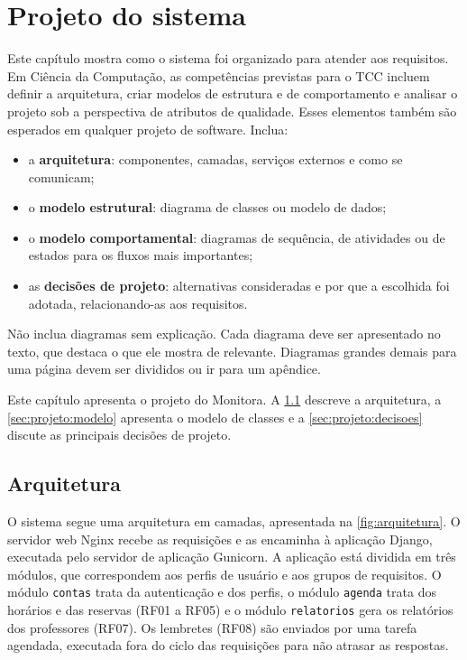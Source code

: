 \chapter{Projeto do sistema}
\label{cap:projeto}

\begin{instrucao}
Este capítulo mostra como o sistema foi organizado para atender aos
requisitos. Em Ciência da Computação, as competências previstas para o TCC
incluem definir a arquitetura, criar modelos de estrutura e de comportamento e
analisar o projeto sob a perspectiva de atributos de qualidade. Esses
elementos também são esperados em qualquer projeto de software. Inclua:
\begin{itemize}
  \item a \textbf{arquitetura}: componentes, camadas, serviços externos e como
        se comunicam;
  \item o \textbf{modelo estrutural}: diagrama de classes ou modelo de dados;
  \item o \textbf{modelo comportamental}: diagramas de sequência, de atividades
        ou de estados para os fluxos mais importantes;
  \item as \textbf{decisões de projeto}: alternativas consideradas e por que a
        escolhida foi adotada, relacionando-as aos requisitos.
\end{itemize}
Não inclua diagramas sem explicação. Cada diagrama deve ser apresentado no
texto, que destaca o que ele mostra de relevante. Diagramas grandes demais
para uma página devem ser divididos ou ir para um apêndice.
\end{instrucao}

Este capítulo apresenta o projeto do Monitora. A
\cref{sec:projeto:arquitetura} descreve a arquitetura, a
\cref{sec:projeto:modelo} apresenta o modelo de classes e a
\cref{sec:projeto:decisoes} discute as principais decisões de projeto.

\section{Arquitetura}
\label{sec:projeto:arquitetura}

O sistema segue uma arquitetura em camadas, apresentada na
\cref{fig:arquitetura}. O servidor web Nginx recebe as requisições e as
encaminha à aplicação Django, executada pelo servidor de aplicação Gunicorn. A
aplicação está dividida em três módulos, que correspondem aos perfis de
usuário e aos grupos de requisitos. O módulo \texttt{contas} trata da
autenticação e dos perfis, o módulo \texttt{agenda} trata dos horários e das
reservas (RF01 a RF05) e o módulo \texttt{relatorios} gera os relatórios dos
professores (RF07). Os lembretes (RF08) são enviados por uma tarefa agendada,
executada fora do ciclo das requisições para não atrasar as respostas.

